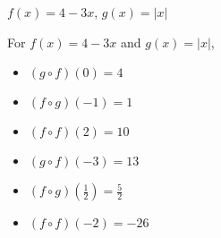 {$f(x) = 4-3x$, $g(x) = |x|$}
{For   $f(x) = 4-3x$ and  $g(x) = |x|$,
\begin{multicols}{2}

\begin{itemize}

\item  $(g\circ f)(0) = 4$

\item  $(f\circ g)(-1) = 1$

\item  $(f \circ f)(2) = 10$

\item  $(g\circ f)(-3) = 13$

\item  $(f\circ g)\left(\frac{1}{2}\right) = \frac{5}{2}$

\item  $(f \circ f)(-2) = -26$

\end{itemize}

\end{multicols}}